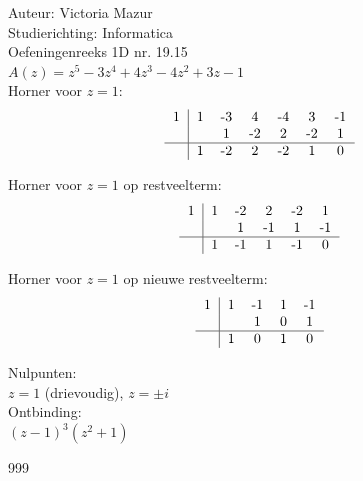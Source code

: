 \documentclass[a4paper]{article}
\begin{document}
\normalsize
\noindent \large Auteur: Victoria Mazur \\
\noindent \large Studierichting: Informatica \\
\noindent \large Oefeningenreeks 1D nr. 19.15 \\

$ A(z) = z^5 - 3z^4 + 4z^3 - 4z^2 + 3z - 1 $ \\

Horner voor $z=1$:
\[
\begin{tabular}{c|cccccc}
1 & 1 & -3 & 4 & -4 & 3 & -1 \\
  &   & 1 & -2 & 2 & -2 & 1 \\ \hline
  & 1 & -2 & 2 & -2 & 1 & 0 \\
\end{tabular}
\]

Horner voor $z=1$ op restveelterm:
\[
\begin{tabular}{c|ccccc}
1 & 1 & -2 & 2 & -2 & 1 \\
  &   & 1 & -1 & 1 & -1 \\ \hline
  & 1 & -1 & 1 & -1 & 0 \\
\end{tabular}
\]

Horner voor $z=1$ op nieuwe restveelterm:
\[
\begin{tabular}{c|cccc}
1 & 1 & -1 & 1 & -1 \\
  &   & 1 & 0 & 1 \\ \hline
  & 1 & 0 & 1 & 0 \\
\end{tabular}
\]

Nulpunten: \\

$ z = 1 $ (drievoudig), $ z = \pm i $ \\

Ontbinding: \\

$ (z - 1)^3(z^2 + 1) $ \\

\begin{thebibliography}{999}
\end{thebibliography}
\end{document}
